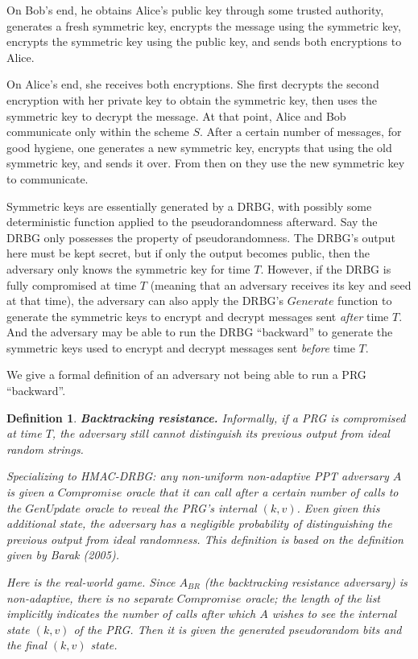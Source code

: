 \documentclass[12pt,lot, lof]{puthesis}
\newtheorem{dfn}[thm]{Definition}
\begin{document}
{On Bob's end, he obtains Alice's public key through some trusted authority, generates a fresh symmetric key, encrypts the message using the symmetric key, encrypts the symmetric key using the public key, and sends both encryptions to Alice.

On Alice's end, she receives both encryptions. She first decrypts the second encryption with her private key to obtain the symmetric key, then uses the symmetric key to decrypt the message. At that point, Alice and Bob communicate only within the scheme $S$. After a certain number of messages, for good hygiene, one generates a new symmetric key, encrypts that using the old symmetric key, and sends it over. From then on they use the new symmetric key to communicate.

Symmetric keys are essentially generated by a DRBG, with possibly some deterministic function applied to the pseudorandomness afterward. Say the DRBG only possesses the property of pseudorandomness. The DRBG's output here must be kept secret, but if only the output becomes public, then the adversary only knows the symmetric key for time $T$. However, if the DRBG is fully compromised at time $T$ (meaning that an adversary receives its key and seed at that time), the adversary can also apply the DRBG's $Generate$ function to generate the symmetric keys to encrypt and decrypt messages sent \emph{after} time $T$. And the adversary may be able to run the DRBG ``backward'' to generate the symmetric keys used to encrypt and decrypt messages sent \emph{before} time $T$.

We give a formal definition of an adversary not being able to run a PRG ``backward''.

\begin{dfn} \textbf{Backtracking resistance.} Informally, if a PRG is compromised at time $T$, the adversary still cannot distinguish its previous output from ideal random strings. 

Specializing to HMAC-DRBG: any non-uniform non-adaptive PPT adversary $A$ is given a $Compromise$ oracle that it can call after a certain number of calls to the $GenUpdate$ oracle to reveal the PRG's internal $(k,v)$. Even given this additional state, the adversary has a negligible probability of distinguishing the previous output from ideal randomness. This definition is based on the definition given by Barak (2005).

Here is the real-world game. Since $A_{BR}$ (the backtracking resistance adversary) is non-adaptive, there is no separate $Compromise$ oracle; the length of the list implicitly indicates the number of calls after which $A$ wishes to see the internal state $(k,v)$ of the PRG. Then it is given the generated pseudorandom bits and the final $(k,v)$ state.\\


\end{dfn}}
\end{document}
